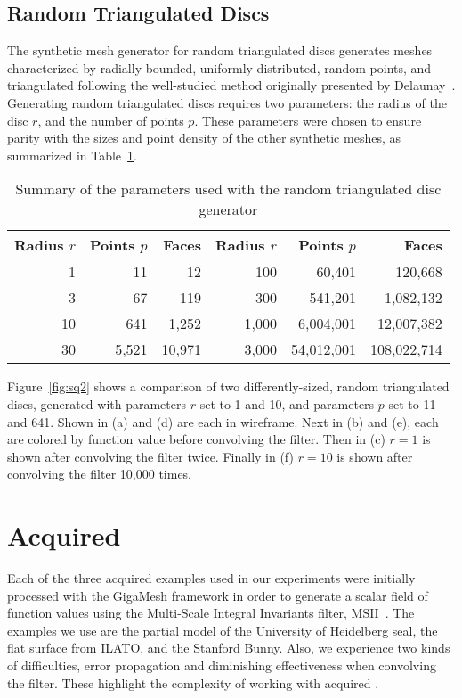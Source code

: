 \subsection{Random Triangulated Discs}
\label{ch6sSTDDssRTD}
The synthetic mesh generator for random triangulated discs generates meshes characterized by radially bounded, uniformly distributed, random points, and triangulated following the well-studied method originally presented by Delaunay~\cite{Delaunay34}. Generating random triangulated discs requires two parameters: the radius of the disc $r$, and the number of points $p$. These parameters were chosen to ensure parity with the sizes and point density of the other synthetic meshes, as summarized in Table~\ref{tbl:rdisc}.
\vspace*{-.5\baselineskip}
\begin{table}[ht]
\begin{tabular}{rrr|rrr}
\textbf{Radius $r$} & \textbf{Points $p$} & \textbf{Faces} & \textbf{Radius $r$} & \textbf{Points $p$} & \textbf{Faces}\\
\hline
    1 &         11 &          12 &   100 &     60,401 &     120,668\\
    3 &         67 &         119 &   300 &    541,201 &   1,082,132\\
   10 &        641 &       1,252 & 1,000 &  6,004,001 &  12,007,382\\
   30 &      5,521 &      10,971 & 3,000 & 54,012,001 & 108,022,714%
\caption{Summary of the parameters used with the random triangulated disc generator\label{tbl:rdisc}}
\end{tabular}
\end{table}

Figure~\ref{fig:sq2} shows a comparison of two differently-sized, random triangulated discs, generated with parameters $r$ set to 1 and 10, and parameters $p$ set to 11 and 641. Shown in (a) and (d) are each in wireframe. Next in (b) and (e), each are colored by function value before convolving the filter. Then in (c) $r=1$ is shown after convolving the filter twice. Finally in (f) $r=10$ is shown after convolving the filter 10,000 times.

\vspace*{-\baselineskip}


%
%
%
%
%
%
\pagebreak
\section{Acquired \tdd{}}
\label{ch6sATDD}
Each of the three acquired \tdd{} examples used in our experiments were initially processed with the GigaMesh framework in order to generate a scalar field of function values using the Multi-Scale Integral Invariants filter, MSII~\cite{Mara12}. The examples we use are the partial model of the University of Heidelberg seal, the flat surface from ILATO, and the Stanford Bunny. Also, we experience two kinds of difficulties, error propagation and diminishing effectiveness when convolving the filter. These highlight the complexity of working with acquired \tdd{}.

